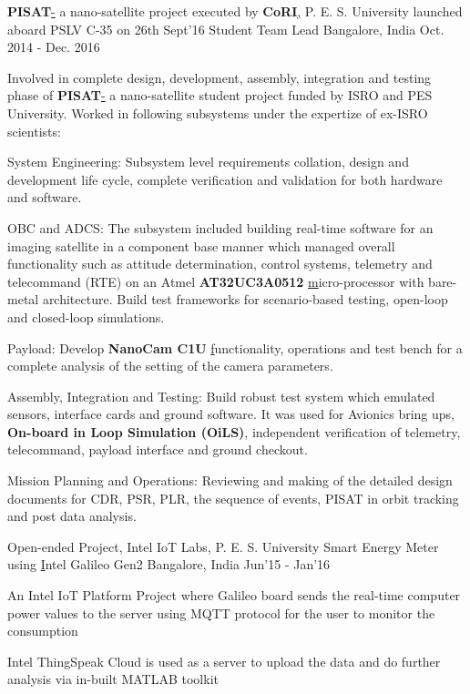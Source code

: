
\begin{cventries}
	\cventry
	{\textbf{PISAT}\href{http://pisat.pes.edu/}- a nano-satellite project executed by \textbf{CoRI}\href{http://cori.pes.edu/}, P. E. S. University launched aboard PSLV C-35 on 26th Sept'16}
	{Student Team Lead}
	{Bangalore, India}
	{Oct. 2014 - Dec. 2016}
	{
		\begin{cvitems}
		\item{Involved in complete design, development, assembly, integration and testing phase of \textbf{PISAT}\href{https://www.isro.gov.in/Spacecraft/pisat} - a nano-satellite student project funded by ISRO and PES University. Worked in following subsystems under the expertize of ex-ISRO scientists:}
		\item{System Engineering: Subsystem level requirements collation, design and development life cycle, complete verification and validation for both hardware and software.}
		\item{OBC and ADCS: The subsystem included building real-time software for an imaging satellite in a component base manner which managed overall functionality such as attitude determination, control systems, telemetry and telecommand (RTE) on an Atmel \textbf{AT32UC3A0512 }\href{https://www.microchip.com/wwwproducts/en/AT32UC3A0512} micro-processor with bare-metal architecture. Build test frameworks for scenario-based testing, open-loop and closed-loop simulations.}
		\item{Payload: Develop \textbf{NanoCam C1U }\href{https://gomspace.com/UserFiles/Subsystems/datasheet/gs-ds-nanocam-c1u-17.pdf} functionality, operations and test bench for a complete analysis of the setting of the camera parameters.}
		\item{Assembly, Integration and Testing: Build robust test system which emulated sensors, interface cards and ground software. It was used for Avionics bring ups, \textbf{On-board in Loop Simulation (OiLS)}, independent verification of telemetry, telecommand, payload interface and ground checkout.}
		\item{Mission Planning and Operations: Reviewing and making of the detailed design documents for CDR, PSR, PLR, the sequence of events, PISAT in orbit tracking and post data analysis.}
		\end{cvitems}
	}
\end{cventries}
\begin{cventries}
	\cventry
	{Open-ended Project, Intel IoT Labs, P. E. S. University}
	{Smart Energy Meter using \href{https://www.arduino.cc/en/ArduinoCertified/IntelGalileoGen2}Intel Galileo Gen2}
	{Bangalore, India}
	{Jun'15 - Jan'16}
	{
		\begin{cvitems}
		\item{An Intel IoT Platform Project where Galileo board sends the real-time computer power values to the server using MQTT protocol for the user to monitor the consumption}
		\item{Intel ThingSpeak Cloud is used as a server to upload the data and do further analysis via in-built MATLAB toolkit}
		\end{cvitems}
	}
\end{cventries}
